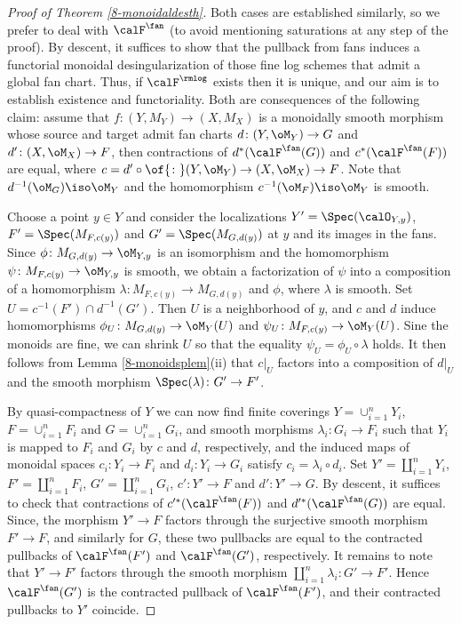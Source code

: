 \documentclass[10pt]{../fichiers-configuration-latex/smfart}
\begin{document}
\begin{proof}[Proof of Theorem \ref{8-monoidaldesth}] Both
cases are established similarly, so we prefer to deal with
$\calF^\fan$ (to avoid mentioning saturations at any step of
the proof). By descent, it suffices to show that the pullback
from fans induces a functorial monoidal desingularization of
those fine log schemes that admit a global fan chart. Thus,
if $\calF^\rmlog$ exists then it is unique, and our aim is to
establish existence and functoriality. Both are consequences of
the following claim: assume that $f{\colon}(Y,M_Y)\to(X,M_X)$
is a monoidally smooth morphism whose source and target admit fan
charts $d{\colon}(Y,\oM_Y)\to G$ and $d'{\colon}(X,\oM_X)\to F$,
then contractions of $d^*(\calF^\fan(G))$ and $c^*(\calF^\fan(F))$
are equal, where $c=d'\circ\of{\colon}(Y,\oM_Y)\to(X,\oM_X)\to
F$. Note that $d^{-1}(\oM_G)\iso\oM_Y$ and the homomorphism
$c^{-1}(\oM_F)\iso\oM_Y$ is smooth.

Choose a point $y\in Y$ and consider the localizations
$Y'=\Spec(\calO_{Y,y})$, $F'=\Spec(M_{F,c(y)})$ and
$G'=\Spec(M_{G,d(y)})$ at $y$ and its images in the fans. Since
$\phi{\colon}M_{G,d(y)}\to\oM_{Y,y}$ is an isomorphism and the
homomorphism $\psi{\colon}M_{F,c(y)}\to\oM_{Y,y}$ is smooth,
we obtain a factorization of $\psi$ into a composition of
a homomorphism $\lambda{\colon}M_{F,c(y)}\to M_{G,d(y)}$
and $\phi$, where $\lambda$ is smooth. Set $U=c^{-1}(F')\cap
d^{-1}(G')$. Then $U$ is a neighborhood of $y$, and $c$ and $d$
induce homomorphisms $\phi_U{\colon}M_{G,d(y)}\to\oM_Y(U)$ and
$\psi_U{\colon}M_{F,c(y)}\to\oM_Y(U)$. Sine the monoids are fine,
we can shrink $U$ so that the equality $\psi_U=\phi_U\circ\lambda$
holds. It then follows from Lemma \ref{8-monoidsplem}(ii) that
$c|_U$ factors into a composition of $d|_U$ and the smooth morphism
$\Spec(\lambda){\colon}G'\to F'$.

By quasi-compactness of $Y$ we can now find finite coverings
$Y=\cup_{i=1}^nY_i$, $F=\cup_{i=1}^nF_i$ and $G=\cup_{i=1}^nG_i$,
and smooth morphisms $\lambda_i{\colon}G_i\to F_i$ such that
$Y_i$ is mapped to $F_i$ and $G_i$ by $c$ and $d$, respectively,
and the induced maps of monoidal spaces $c_i{\colon}Y_i\to
F_i$ and $d_i{\colon}Y_i\to G_i$ satisfy $c_i=\lambda_i\circ
d_i$. Set $Y'=\coprod_{i=1}^nY_i$, $F'=\coprod_{i=1}^n F_i$,
$G'=\coprod_{i=1}^nG_i$, $c'{\colon}Y'\to F$ and $d'{\colon}Y'\to
G$. By descent, it suffices to check that contractions of
$c'^*(\calF^\fan(F))$ and $d'^*(\calF^\fan(G))$ are equal. Since,
the morphism $Y'\to F$ factors through the surjective smooth morphism
$F'\to F$, and similarly for $G$, these two pullbacks are equal to
the contracted pullbacks of $\calF^\fan(F')$ and $\calF^\fan(G')$,
respectively. It remains to note that $Y'\to F'$ factors through the
smooth morphism $\coprod_{i=1}^n\lambda_i{\colon}G'\to F'$. Hence
$\calF^\fan(G')$ is the contracted pullback of $\calF^\fan(F')$,
and their contracted pullbacks to $Y'$ coincide.  \end{proof}
\end{document}

